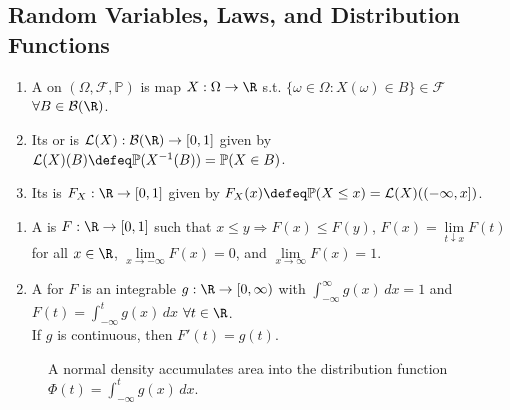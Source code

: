 \subsection{Random Variables, Laws, and Distribution Functions}
\begin{definition} \label{def:random-variable-law-and-cdf} 
\begin{enumerate}[label=(\roman*)]
\setlength{\itemsep}{0pt}
\item A  on $(\Omega,\mathcal{F},\mathbb{P})$ is map $X:\Omega\to\R$ s.t. $\{\omega\in\Omega:X(\omega)\in B\}\in\mathcal{F}$ $\forall B\in\mathcal{B}(\R)$.
\item Its  or  is $\mathcal{L}(X):\mathcal{B}(\R)\to[0,1]$ given by $\mathcal{L}(X)(B)\defeq\mathbb{P}(X^{-1}(B))=\mathbb{P}(X\in B)$.
\item Its  is $F_X:\R\to[0,1]$ given by $F_X(x)\defeq\mathbb{P}(X\leq x)=\mathcal{L}(X)((-\infty,x])$.
\end{enumerate}
\end{definition}

\begin{definition} \label{def:distribution-function-and-density} 
\begin{enumerate}[label=(\roman*)]
\setlength{\itemsep}{0pt}
\item A  is $F:\R\to[0,1]$ such that $x\leq y\Rightarrow F(x)\leq F(y)$, $F(x)=\lim\limits_{t\downarrow x}F(t)$ for all $x\in\R$, $\lim\limits_{x\to-\infty}F(x)=0$, and $\lim\limits_{x\to\infty}F(x)=1$.
\item A  for $F$ is an integrable $g:\R\to[0,\infty)$ with $\int_{-\infty}^{\infty}g(x)\,dx=1$ and $F(t)=\int_{-\infty}^{t}g(x)\,dx$ $\forall t\in\R$.\\
If $g$ is continuous, then $F'(t)=g(t)$.
\end{enumerate}
\end{definition}

\begin{figure}[H]
  \centering
  
  \caption{A normal density accumulates area into the distribution function $\Phi(t)=\int_{-\infty}^{t}g(x)\,dx$.}
  \label{fig:normal-distribution-cdf}
\end{figure}

